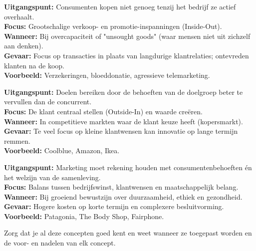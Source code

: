 \documentclass[a4paper,11pt]{article}
\begin{document}
\begin{tcolorbox}[schoolstyle, title=3. Verkoopconcept, colframe=schoolBlue!80!black, colback=white]
    \textbf{Uitgangspunt:} Consumenten kopen niet genoeg tenzij het bedrijf ze actief overhaalt. \\
    \textbf{Focus:} Grootschalige verkoop- en promotie-inspanningen (Inside-Out). \\
    \textbf{Wanneer:} Bij overcapaciteit of "unsought goods" (waar mensen niet uit zichzelf aan denken). \\
    \textbf{Gevaar:} Focus op transacties in plaats van langdurige klantrelaties; ontevreden klanten na de koop. \\
    \textbf{Voorbeeld:} Verzekeringen, bloeddonatie, agressieve telemarketing.
\end{tcolorbox}

\begin{tcolorbox}[schoolstyle, title=4. Marketingconcept, colframe=schoolBlue!80!black, colback=white]
    \textbf{Uitgangspunt:} Doelen bereiken door de behoeften van de doelgroep beter te vervullen dan de concurrent. \\
    \textbf{Focus:} De klant centraal stellen (Outside-In) en waarde creëren. \\
    \textbf{Wanneer:} In competitieve markten waar de klant keuze heeft (kopersmarkt). \\
    \textbf{Gevaar:} Te veel focus op kleine klantwensen kan innovatie op lange termijn remmen. \\
    \textbf{Voorbeeld:} Coolblue, Amazon, Ikea.
\end{tcolorbox}

\begin{tcolorbox}[schoolstyle, title=5. Maatschappelijk Marketingconcept, colframe=schoolBlue!80!black, colback=white]
    \textbf{Uitgangspunt:} Marketing moet rekening houden met consumentenbehoeften én het welzijn van de samenleving. \\
    \textbf{Focus:} Balans tussen bedrijfswinst, klantwensen en maatschappelijk belang. \\
    \textbf{Wanneer:} Bij groeiend bewustzijn over duurzaamheid, ethiek en gezondheid. \\
    \textbf{Gevaar:} Hogere kosten op korte termijn en complexere besluitvorming. \\
    \textbf{Voorbeeld:} Patagonia, The Body Shop, Fairphone.
\end{tcolorbox}

\begin{examenbox}
    Zorg dat je al deze concepten goed kent en weet wanneer ze toegepast worden en de 
    voor- en nadelen van elk concept.
\end{examenbox}
\end{document}
